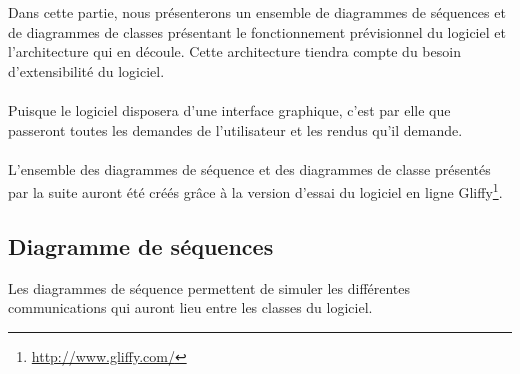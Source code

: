 Dans cette partie, nous présenterons un ensemble de diagrammes de séquences et de diagrammes de classes présentant le fonctionnement prévisionnel du logiciel et l’architecture qui en découle. Cette architecture tiendra compte du besoin d’extensibilité du logiciel.

\paragraph{}
Puisque le logiciel disposera d’une interface graphique, c’est par elle que passeront toutes les demandes de l’utilisateur et les rendus qu’il demande.

\paragraph{}
L’ensemble des diagrammes de séquence et des diagrammes de classe présentés par la suite auront été créés grâce à la version d’essai du logiciel en ligne Gliffy\footnote{\url{http://www.gliffy.com/}}.


\subsection{Diagramme de séquences}

Les diagrammes de séquence permettent de simuler les différentes communications qui auront lieu entre les classes du logiciel.

